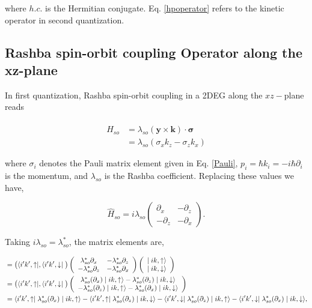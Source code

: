 \documentclass[10pt,prb,showpacs,amssymb,floatfix]{revtex4-1}
\newcommand{\nn}{\nonumber}
\newcommand{\lam}{\lambda}
\newcommand{\sg}{\sigma}
\begin{document}
where $h.c.$ is the Hermitian conjugate. Eq. \eqref{hpoperator} refers to the kinetic operator in second quantization.

\subsection{Rashba spin-orbit coupling Operator along the xz-plane}
\label{sec:rashbaxz}

In first quantization, Rashba spin-orbit coupling in a 2DEG along the $xz-$plane reads 

\begin{align}
\hat H_{so} &= \lam_{so}(\bm y \times \bm k)\cdot \bm \sg \nn\\&
= \lambda_{so} (\sigma_x k_z - \sigma_z k_x) 
\label{alpxz}
\end{align}

where $\sigma_i$ denotes the Pauli matrix element given in Eq. \eqref{Pauli}, $p_i=\hbar k_i = -i\hbar \partial_i$ is the momentum, and $\lambda_{so}$ is the Rashba coefficient. Replacing these values we have,

\begin{equation}
\hat H_{so} =  i\lambda_{so} \left(\begin{array}{cc} 
\partial_x  &  -\partial_z\\
-\partial_z &  -\partial_x 
\end{array}\right).
\label{eq11xz}
\end{equation}

Taking $i\lam_{so} = \lam_{so}^*$, the matrix elements are,

\begin{align}
&=  \big{(} \langle i'k',\uparrow \mid , \langle i'k',\downarrow \mid \big{)} \left(\begin{array}{cc} 
\lambda_{so}^* \partial_x &  -\lambda_{so}^* \partial_z\\
 -\lambda_{so}^*\partial_z & -\lambda_{so}^* \partial_x
\end{array}\right)  \left(\begin{array}{c} 
\mid ik,\uparrow \rangle \\
\mid ik,\downarrow \rangle
\end{array}\right) \\
&= \big{(}\langle i'k',\uparrow \mid , \langle i'k',\downarrow \mid \big{)}  \left(\begin{array}{c} 
\lambda_{so}^*(\partial_x) \mid ik,\uparrow \rangle-\lambda_{so}^*(\partial_z) \mid ik,\downarrow \rangle \\
-\lambda_{so}^*(\partial_z) \mid ik,\uparrow \rangle - \lambda_{so}^*(\partial_x) \mid ik,\downarrow \rangle
\end{array}\right) \\
&= \langle i'k',\uparrow \mid  \lambda_{so}^*(\partial_x) \mid ik,\uparrow \rangle - \langle i'k',\uparrow \mid  \lambda_{so}^*(\partial_z) \mid ik,\downarrow \rangle -
 \langle i'k',\downarrow \mid \lambda_{so}^*(\partial_z) \mid ik,\uparrow \rangle - \langle i'k',\downarrow \mid \lambda_{so}^*(\partial_x) \mid ik,\downarrow \rangle,
\label{eq12xz}
\end{align}
\end{document}
